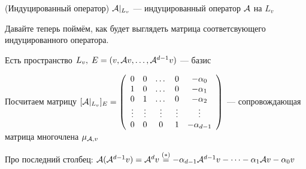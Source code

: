 \begin{conj}(Индуцированный оператор)
    $\mathcal{A} |_{L_{v}}$ --- индуцированный оператор $\mathcal{A}$ на $L_v$
\end{conj}

\vspace*{3mm}
Давайте теперь поймём, как будет выглядеть матрица соответсвующего индуцированного оператора.
\vspace*{3mm}

\begin{conj}
    Есть пространство $ L_v, \; E = (v, \mathcal{A} v, \dots, \mathcal{A}^{d - 1}v) $ --- базис 

    Посчитаем матрицу $[\mathcal{A} |_{L_{v}}]_E = 
    \left(\begin{array}{ccccc}
        0 & 0 & \dots & 0 & -\alpha_0 \\ 
        1 & 0 & \dots & 0 & -\alpha_1 \\ 
        0 & 1 & \dots & 0 & -\alpha_2 \\ 
        \vdots & \vdots & \vdots & \vdots & \vdots \\ 
        0 & 0 & 0 & 1 & -\alpha_{d - 1}
    \end{array}\right)$ --- сопровождающая матрица многочлена $\mu_{\mathcal{A}, v}$
        
    Про последний столбец: $\mathcal{A}(\mathcal{A}^{d - 1}v) = \mathcal{A}^d v \stackrel{(*)}{=} - \alpha_{d - 1} \mathcal{A}^{d - 1}v - \dots - \alpha_1 \mathcal{A} v - \alpha_0 v $
        
\end{conj}

